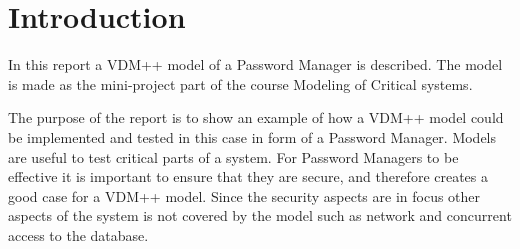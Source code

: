 \chapter{Introduction}

In this report a VDM++ model of a Password Manager is described. The model is made as the mini-project part of the course Modeling of Critical systems.

The purpose of the report is to show an example of how a VDM++ model could be implemented and tested in this case in form of a Password Manager. Models are useful to test critical parts of a system. For Password Managers to be effective it is important to ensure that they are secure, and therefore creates a good case for a VDM++ model. Since the security aspects are in focus other aspects of the system is not covered by the model such as network and concurrent access to the database.

